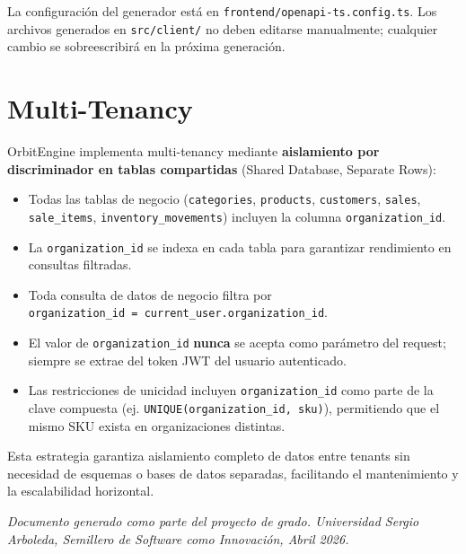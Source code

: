 La configuración del generador está en \texttt{frontend/openapi-ts.config.ts}. Los archivos generados en \texttt{src/client/} no deben editarse manualmente; cualquier cambio se sobreescribirá en la próxima generación.

\section{Multi-Tenancy}\label{multi-tenancy}

OrbitEngine implementa multi-tenancy mediante \textbf{aislamiento por discriminador en tablas compartidas} (Shared Database, Separate Rows):

\begin{itemize}
\tightlist
\item
  Todas las tablas de negocio (\texttt{categories}, \texttt{products}, \texttt{customers}, \texttt{sales}, \texttt{sale\_items}, \texttt{inventory\_movements}) incluyen la columna \texttt{organization\_id}.
\item
  La \texttt{organization\_id} se indexa en cada tabla para garantizar rendimiento en consultas filtradas.
\item
  Toda consulta de datos de negocio filtra por \texttt{organization\_id\ =\ current\_user.organization\_id}.
\item
  El valor de \texttt{organization\_id} \textbf{nunca} se acepta como parámetro del request; siempre se extrae del token JWT del usuario autenticado.
\item
  Las restricciones de unicidad incluyen \texttt{organization\_id} como parte de la clave compuesta (ej. \texttt{UNIQUE(organization\_id,\ sku)}), permitiendo que el mismo SKU exista en organizaciones distintas.
\end{itemize}

Esta estrategia garantiza aislamiento completo de datos entre tenants sin necesidad de esquemas o bases de datos separadas, facilitando el mantenimiento y la escalabilidad horizontal.

\emph{Documento generado como parte del proyecto de grado. Universidad Sergio Arboleda, Semillero de Software como Innovación, Abril 2026.}
